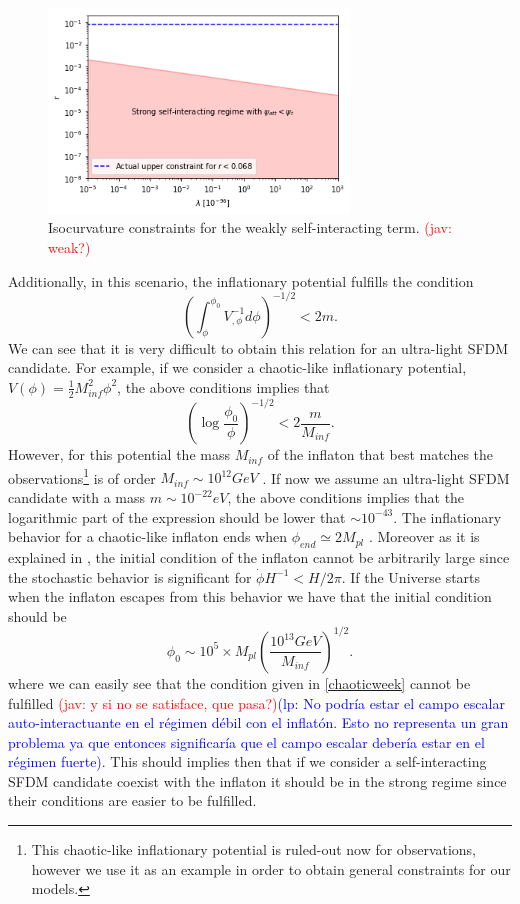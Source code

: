 \documentclass[amssymb,twocolumn,prd,nofootinbib,showpacs]{revtex4-1}
\newcommand{\jav}[1]{\textcolor{red}{(jav: #1)}}
\newcommand{\lp}[1]{\textcolor{blue}{(lp: #1)}}
\begin{document}
\begin{figure}[h!]
\includegraphics[width=8cm]{lambdavsr.png}
\caption{Isocurvature constraints for the weakly self-interacting term. \jav{weak?}}\label{constraintsSFDMl}
\end{figure} 

Additionally, in this scenario, the inflationary potential fulfills the condition 
%
\begin{equation}
\left(\int^{\phi_0}_\phi V_{,\phi}^{-1}d\phi\right)^{-1/2}<2m.
\end{equation}
%
We can see that it is very difficult to obtain this relation for an ultra-light SFDM candidate. 
For example, if we consider a chaotic-like inflationary potential, $V(\phi)=\frac{1}{2}M_{inf}^2\phi^2$, 
the above conditions implies that
%
\begin{equation}\label{chaoticweek}
\left(\log\frac{\phi_0}{\phi}\right)^{-1/2}<2\frac{m}{M_{inf}}.
\end{equation}
%
However, for this potential the mass $M_{inf}$ of the inflaton 
that best matches the observations\footnote{This chaotic-like inflationary potential is 
ruled-out now for observations, however we use it as an example in order to obtain 
general constraints for our models.} is of order $M_{inf}\sim 10^{12} GeV$ \cite{Liddle}. 
If now we assume an ultra-light SFDM candidate with a mass $m\sim 10^{-22}eV$, 
the above conditions implies that the logarithmic part of the expression should be 
lower that $\sim 10^{-43}$. The inflationary behavior for a chaotic-like inflaton ends 
when $\phi_{end}\simeq 2M_{pl}$ \cite{curvatonatractor,Liddle}. Moreover as it is 
explained in \cite{curvatonatractor}, the initial condition of the inflaton cannot be 
arbitrarily large since the stochastic behavior is significant for $\dot\phi H^{-1}<H/2\pi$. 
%
If the Universe starts when the inflaton escapes from this 
behavior we have that the initial condition should be
%
\begin{equation}\label{phi_0}
\phi_0\sim 10^5\times M_{pl}\left(\frac{10^{13}GeV}{M_{inf}}\right)^{1/2}.
\end{equation}
%
where we can easily see that the condition given in \eqref{chaoticweek} cannot be fulfilled 
\jav{y si no se satisface, que pasa?}\lp{No podr\'ia estar el campo escalar auto-interactuante en
el r\'egimen d\'ebil con el inflat\'on.  Esto no representa un
gran problema ya que entonces significar\'ia que el campo
escalar deber\'ia estar en el r\'egimen fuerte}. This should implies then that if we consider a self-interacting SFDM candidate coexist with the inflaton it should be in the strong regime since their conditions are easier to be fulfilled.
\end{document}
